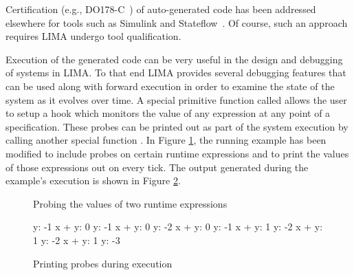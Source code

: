 Certification (e.g., DO178-C~\cite{do178c}) of auto-generated code has
been addressed elsewhere for tools such as Simulink and
Stateflow~\cite{mbd-cert}. Of course, such an approach requires LIMA
undergo tool qualification.

Execution of the generated code can be very useful in the design and debugging
of systems in LIMA. To that end LIMA provides several debugging features that
can be used along with forward execution in order to examine the state of the
system as it evolves over time. A special primitive function called 
allows the user to setup a hook which monitors the value of any expression at
any point of a specification. These probes can be printed out as part of the
system execution by calling another special function . In Figure
\ref{fig:code-gen-probes}, the running example has been modified to include
probes on certain runtime expressions and to print the values of those
expressions out on every tick. The output generated during the example's
execution is shown in Figure \ref{fig:code-gen-print-probes}.



\begin{figure}
\caption{Probing the values of two runtime expressions}
\label{fig:code-gen-probes}
\end{figure}

\begin{figure}
\begin{plaintext}
y: -1
x + y: 0
y: -1
x + y: 0
y: -2
x + y: 0
y: -1
x + y: 1
y: -2
x + y: 1
y: -2
x + y: 1
y: -3
\end{plaintext}
\caption{Printing probes during execution}
\label{fig:code-gen-print-probes}
\end{figure}



